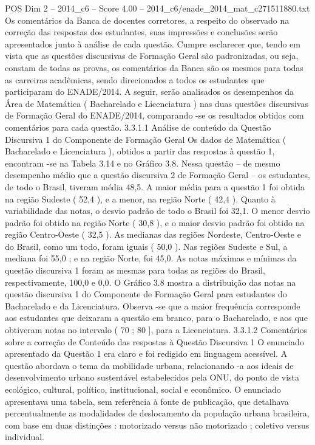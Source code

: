 \begin{textsample}{POS Dim 2 – 2014\_c6 – Score 4.00 – 2014\_c6/enade\_2014\_mat\_c271511880.txt}
Os comentários da Banca de docentes corretores, a respeito do observado na correção das respostas dos estudantes, suas impressões e conclusões serão apresentados junto à análise de cada questão.
Cumpre esclarecer que, tendo em vista que as questões discursivas de Formação Geral são padronizadas, ou seja, constam de todas as provas, os comentários da Banca são os mesmos para todas as carreiras acadêmicas, sendo direcionados a todos os estudantes que participaram do ENADE/2014.
A seguir, serão analisados os desempenhos da Área de Matemática ( Bacharelado e Licenciatura ) nas duas questões discursivas de Formação Geral do ENADE/2014, comparando -se os resultados obtidos com comentários para cada questão. 3.3.1.1 Análise de conteúdo da Questão Discursiva 1 do Componente de Formação Geral Os dados de Matemática ( Bacharelado e Licenciatura ), obtidos a partir das respostas à questão 1, encontram -se na Tabela 3.14 e no Gráfico 3.8.
Nessa questão – de mesmo desempenho médio que a questão discursiva 2 de Formação Geral – os estudantes, de todo o Brasil, tiveram média 48,5.
A maior média para a questão 1 foi obtida na região Sudeste ( 52,4 ), e a menor, na região Norte ( 42,4 ).
Quanto à variabilidade das notas, o desvio padrão de todo o Brasil foi 32,1.
O menor desvio padrão foi obtido na região Norte ( 30,8 ), e o maior desvio padrão foi obtido na região Centro-Oeste ( 32,5 ).
As medianas das regiões Nordeste, Centro-Oeste e do Brasil, como um todo, foram iguais ( 50,0 ).
Nas regiões Sudeste e Sul, a mediana foi 55,0 ; e na região Norte, foi 45,0.
As notas máximas e mínimas da questão discursiva 1 foram as mesmas para todas as regiões do Brasil, respectivamente, 100,0 e 0,0.
O Gráfico 3.8 mostra a distribuição das notas na questão discursiva 1 do Componente de Formação Geral para estudantes do Bacharelado e da Licenciatura.
Observa -se que a maior frequência corresponde aos estudantes que deixaram a questão em branco, para o Bacharelado, e aos que obtiveram notas no intervalo ( 70 ; 80 ], para a Licenciatura. 3.3.1.2 Comentários sobre a correção de Conteúdo das respostas à Questão Discursiva 1 O enunciado apresentado da Questão 1 era claro e foi redigido em linguagem acessível.
A questão abordava o tema da mobilidade urbana, relacionando -a aos ideais de desenvolvimento urbano sustentável estabelecidos pela ONU, do ponto de vista ecológico, cultural, político, institucional, social e econômico.
O enunciado apresentava uma tabela, sem referência à fonte de publicação, que detalhava percentualmente as modalidades de deslocamento da população urbana brasileira, com base em duas distinções : motorizado versus não motorizado ; coletivo versus individual.

\end{textsample}
